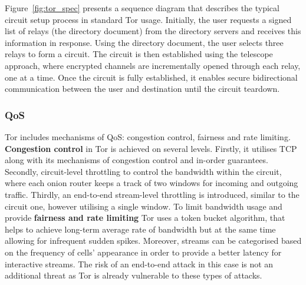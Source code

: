 Figure~\ref{fig:tor_spec} presents a sequence diagram that describes the typical circuit setup process in standard Tor usage. Initially, the user requests a signed list of relays (the directory document) from the directory servers and receives this information in response. Using the directory document, the user selects three relays to form a circuit. The circuit is then established using the telescope approach, where encrypted channels are incrementally opened through each relay, one at a time. Once the circuit is fully established, it enables secure bidirectional communication between the user and destination until the circuit teardown.

\subsubsection{QoS}
Tor includes mechanisms of QoS: congestion control, fairness and rate limiting. \textbf{Congestion control} in Tor is achieved on several levels. Firstly, it utilises TCP along with its mechanisms of congestion control and in-order guarantees. Secondly, circuit-level throttling to control the bandwidth within the circuit, where each onion router keeps a track of two windows for incoming and outgoing traffic. Thirdly, an end-to-end stream-level throttling is introduced, similar to the circuit one, however utilising a single window. To limit bandwidth usage and provide \textbf{fairness and rate limiting} Tor uses a token bucket algorithm, that helps to achieve long-term average rate of bandwidth but at the same time allowing for infrequent sudden spikes. Moreover, streams can be categorised based on the frequency of cells' appearance in order to provide a better latency for interactive streams. The risk of an end-to-end attack in this case is not an additional threat as Tor is already vulnerable to these types of attacks.

